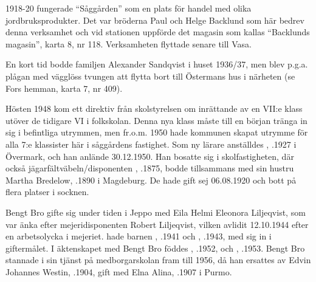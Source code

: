 1918-20 fungerade ``Såggården'' som en plats för handel med olika jordbruksprodukter. Det var bröderna Paul och Helge Backlund som här bedrev denna verksamhet och vid stationen uppförde det magasin som kallas ``Backlunds magasin'', karta 8, nr 118. Verksamheten flyttade senare till Vasa.

En kort tid bodde familjen Alexander Sandqvist i huset 1936/37, men blev p.g.a. plågan med vägglöss tvungen att flytta bort till Östermans hus i närheten (se Fors hemman, karta 7, nr 409).


Hösten 1948 kom ett direktiv från skolstyrelsen om inrättande av en VII:e klass utöver de tidigare VI i folkskolan. Denna nya klass måste till en början tränga in sig i befintliga utrymmen, men fr.o.m. 1950 hade kommunen skapat utrymme för alla 7:e klassister här i såggårdens fastighet. Som ny lärare anställdes , .1927 i Övermark, och han anlände 30.12.1950. Han bosatte sig i skolfastigheten, där också jägarfältväbeln/disponenten , .1875, bodde tillsammans med sin hustru Martha Bredelow, .1890 i Magdeburg. De hade gift sej 06.08.1920 och bott på flera platser i socknen.

Bengt Bro gifte sig under tiden i Jeppo med Eila Helmi Eleonora Liljeqvist, som var änka efter mejeridisponenten Robert Liljeqvist, vilken avlidit 12.10.1944 efter en arbetsolycka i mejeriet.  hade barnen , .1941 och , .1943, med sig in i giftermålet. I äktenskapet med Bengt Bro föddes , .1952, och , .1953. Bengt Bro stannade i sin tjänst på medborgarskolan fram till 1956, då han ersattes av Edvin Johannes Westin, .1904, gift med Elna Alina, .1907 i Purmo.
\begin{jhchildren}
  \item {}
  \item {}
  \item {}
\end{jhchildren}

